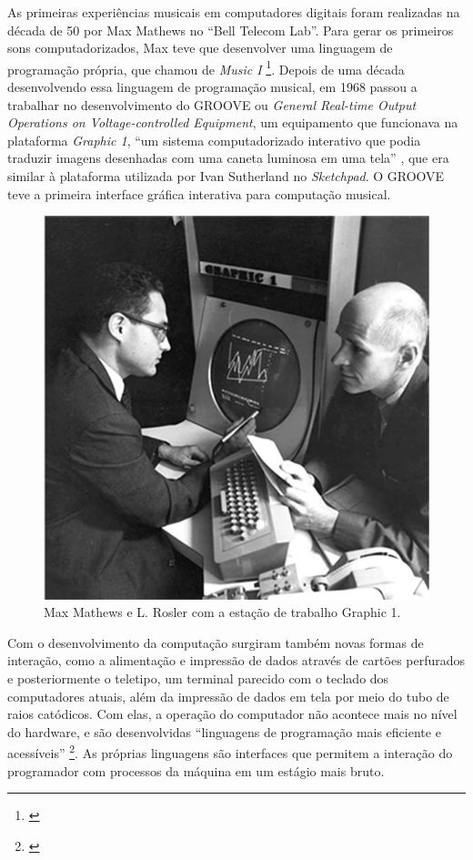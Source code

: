 As primeiras experiências musicais em computadores digitais foram realizadas na década de 50 por Max Mathews no ``Bell Telecom Lab''. Para gerar os primeiros sons computadorizados, Max teve que desenvolver uma linguagem de programação própria, que chamou de \emph{Music I} \footnote{\cite[253]{Holmes1985}}. Depois de uma década desenvolvendo essa linguagem de programação musical, em 1968 passou a trabalhar no desenvolvimento do GROOVE ou \emph{General Real-time Output Operations on Voltage-controlled Equipment}, um equipamento que funcionava na plataforma \emph{Graphic 1}, ``um sistema computadorizado interativo que podia traduzir imagens desenhadas com uma caneta luminosa em uma tela'' \cite[253]{Holmes1985}, que era similar à plataforma utilizada por Ivan Sutherland no \emph{Sketchpad}. O GROOVE teve a primeira interface gráfica interativa para computação musical. 

\begin{figure}
    \caption{\label{max}Max Mathews e L. Rosler com a estação de trabalho Graphic 1. }
    
        \includegraphics[width=0.5\linewidth]{pictures/MaxHolmes-251}
    
\end{figure}

Com o desenvolvimento da computação surgiram também novas formas de interação, como a alimentação e impressão de dados através de cartões perfurados e posteriormente o teletipo, um terminal parecido com o teclado dos computadores atuais, além da impressão de dados em tela por meio do tubo de raios catódicos. Com elas, a operação do computador não acontece mais no nível do hardware, e são desenvolvidas ``linguagens de programação mais eficiente e acessíveis'' \footnote{\cite[111]{IAZZETTA1997}}. As próprias linguagens são interfaces que permitem a interação do programador com processos da máquina em um estágio mais bruto.

